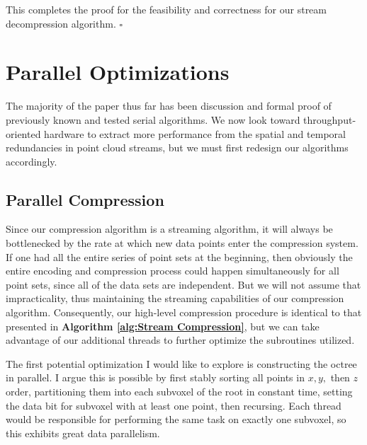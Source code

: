 \documentclass[twoside,twocolumn]{article}
\begin{document}
This completes the proof for the feasibility and correctness for our stream decompression algorithm.
$\square$


\section{Parallel Optimizations} \label{sec:Parallel Optimizations}

The majority of the paper thus far has been discussion and formal proof of previously known and tested
serial algorithms. We now look toward throughput-oriented hardware to extract more performance from the
spatial and temporal redundancies in point cloud streams, but we must first redesign our algorithms
accordingly.


\subsection{Parallel Compression} \label{sec:Parallel Compression}

Since our compression algorithm is a streaming algorithm, it will always be bottlenecked by the rate at
which new data points enter the compression system. If one had all the entire series of point sets at the
beginning, then obviously the entire encoding and compression process could happen simultaneously for all
point sets, since all of the data sets are independent. But we will not assume that impracticality, thus
maintaining the streaming capabilities of our compression algorithm. Consequently, our high-level
compression procedure is identical to that presented in \textbf{Algorithm \ref{alg:Stream Compression}},
but we can take advantage of our additional threads to further optimize the subroutines utilized.

The first potential optimization I would like to explore is constructing the octree in parallel. I argue
this is possible by first stably sorting all points in $x,y,$ then $z$ order, partitioning them into each
subvoxel of the root in constant time, setting the data bit for subvoxel with at least one point, then
recursing. Each thread would be responsible for performing the same task on exactly one subvoxel, so
this exhibits great data parallelism.
\end{document}

